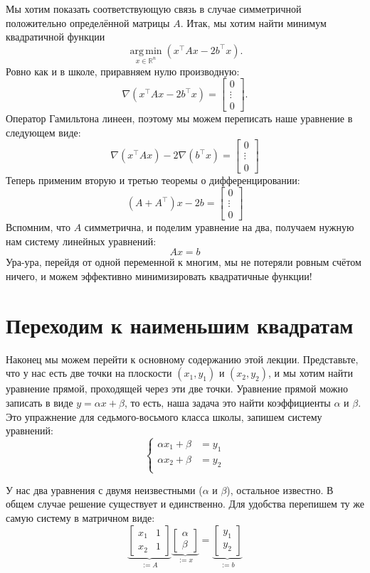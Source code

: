 \documentclass[notitlepage]{report}
\DeclareMathOperator*{\argmin}{arg\,min}
\begin{document}
Мы хотим показать соответствующую связь в случае симметричной положительно определённой матрицы $A$.
Итак, мы хотим найти минимум квадратичной функции 
$$\argmin\limits_{x\in\mathbb R^n} (x^\top A x - 2b^\top x).$$
Ровно как и в школе, приравняем нулю производную:
$$\nabla (x^\top A x - 2b^\top x) = \begin{bmatrix}0 \\ \vdots \\ 0 \end{bmatrix}.$$
Оператор Гамильтона линеен, поэтому мы можем переписать наше уравнение в следующем виде:
$$\nabla (x^\top A x) - 2\nabla(b^\top x) = \begin{bmatrix}0 \\ \vdots \\ 0 \end{bmatrix}$$
Теперь применим вторую и третью теоремы о дифференцировании:
$$(A+A^\top)x - 2b = \begin{bmatrix}0 \\ \vdots \\ 0 \end{bmatrix}$$
Вспомним, что $A$ симметрична, и поделим уравнение на два, получаем нужную нам систему линейных уравнений:
$$Ax = b$$
Ура-ура, перейдя от одной переменной к многим, мы не потеряли ровным счётом ничего, и можем эффективно минимизировать квадратичные функции!


\section{Переходим к наименьшим квадратам}
Наконец мы можем перейти к основному содержанию этой лекции. Представьте, что у нас есть две точки на плоскости $(x_1, y_1)$ и $(x_2, y_2)$, и мы хотим найти уравнение прямой, проходящей через эти две точки.
Уравнение прямой можно записать в виде $y = \alpha x + \beta$, то есть, наша задача это найти коэффициенты $\alpha$ и $\beta$. Это упражнение для седьмого-восьмого класса школы, запишем систему уравнений:
$$
\left\{
\begin{split}
\alpha x_1 + \beta &= y_1\\
\alpha x_2 + \beta &= y_2\\
\end{split}
\right.
$$

У нас два уравнения с двумя неизвестными ($\alpha$ и $\beta$), остальное известно.
В общем случае решение существует и единственно. Для удобства перепишем ту же самую систему в матричном виде:
$$
\underbrace{\begin{bmatrix}x_1  & 1 \\ x_2 & 1 \end{bmatrix}}_{:=A} 
\underbrace{\begin{bmatrix} \alpha \\ \beta \end{bmatrix}}_{:=x} = \underbrace{\begin{bmatrix} y_1 \\ y_2 \end{bmatrix}}_{:=b}
$$
\end{document}
